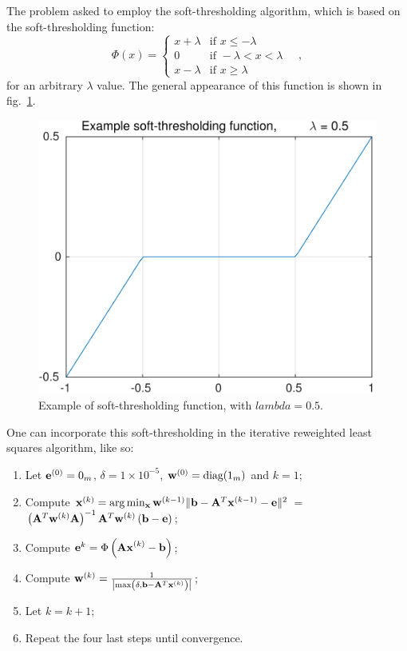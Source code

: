 \documentclass{report}
\begin{document}
The problem asked to employ the soft-thresholding algorithm, which is based on the soft-thresholding function:
\begin{equation}
\Phi(x) = 
\begin{cases}
  x + \lambda & \text{if } x\leq -\lambda \\ 
  0           & \text{if } -\lambda < x < \lambda \\
  x - \lambda & \text{if } x\geq \lambda
\end{cases}
\quad,
\end{equation}
for an arbitrary $\lambda$ value. The general appearance of this function is shown in fig.~\ref{q5b:soft-thresh}.

\begin{figure}
  \centering
  \includegraphics[width=0.45\linewidth]{q5c_soft_threshold_example.pdf}
  \caption[ Example soft-thresholding function ]
   {Example of soft-thresholding function, with $lambda = 0.5$.}
  \label{q5b:soft-thresh}
\end{figure}

One can incorporate this soft-thresholding in the iterative reweighted least squares algorithm, like so:
\begin{enumerate}
  \item Let $\mathbf{e}^{(0)} = 0_m$, $\delta = 1\times10^{-5}$, $\mathbf{w}^{(0)} = \text{diag}(1_m)$ and $k = 1$;
  \item Compute $\mathbf{x}^{(k)} = \arg \min_{\mathbf{x}} \mathbf{w}^{(k-1)} \| \mathbf{b} - \mathbf{A}^T\mathbf{x}^{(k-1)} - \mathbf{e} \|^2$ = $\left( \mathbf{A}^T\mathbf{w}^{(k)}\mathbf{A} \right)^{-1} \mathbf{A}^T\mathbf{w}^{(k)}\left(\mathbf{b} - \mathbf{e}\right)$;
  \item Compute $\mathbf{e}^{k} = \Phi\left( \mathbf{Ax}^{(k)} - \mathbf{b} \right)$;
  \item Compute $\mathbf{w}^{(k)} = \frac{1}{\left\lvert \max\left(\delta, \mathbf{b} - \mathbf{A}^T\mathbf{x}^{(k)}\right) \right\rvert}$;
  \item Let $k = k + 1$;
  \item Repeat the four last steps until convergence.
\end{enumerate}
\end{document}
